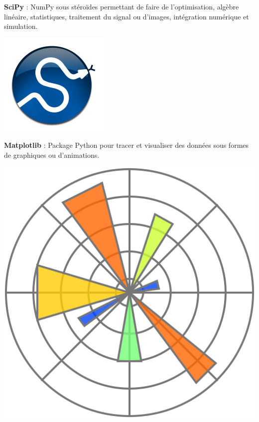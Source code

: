 \documentclass[aspectratio=169]{beamer}
\begin{document}
\begin{frame}

  \begin{minipage}{.64\textwidth}
    \textbf{\alert{SciPy}} : NumPy sous stéroïdes permettant de faire de l'optimisation, algèbre linéaire, statistiques, traitement du signal ou d'images, intégration numérique et simulation.
  \end{minipage}%
  \hfill
  \begin{minipage}{.32\textwidth}
    \centering
    \includegraphics[width=.75\textwidth]{scipy_logo}
  \end{minipage}

  \vspace{-1cm}
\end{frame}

\begin{frame}

  \begin{minipage}{.64\textwidth}
    \textbf{\alert{Matplotlib}} : Package Python pour tracer et visualiser des données sous formes de graphiques ou d'animations.
  \end{minipage}%
  \hfill
  \begin{minipage}{.32\textwidth}
    \centering
    \includegraphics[width=.75\textwidth]{matplotlib_logo}
  \end{minipage}

  \vspace{-1cm}
\end{frame}
\end{document}
